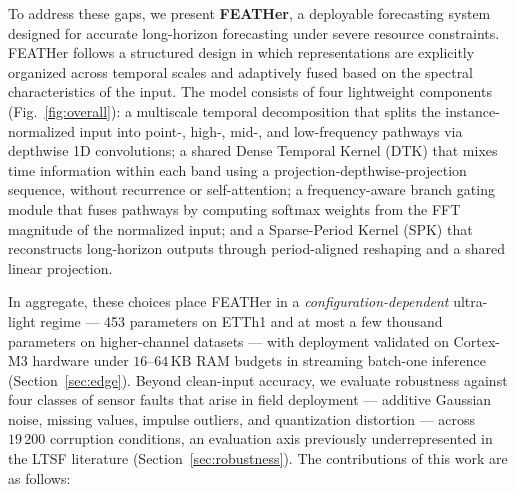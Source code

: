 \documentclass[journal]{IEEEtran}
\theoremstyle{remark}
\begin{document}
To address these gaps, we present \textbf{FEATHer}, a deployable
forecasting system designed for accurate long-horizon forecasting
under severe resource constraints. FEATHer follows a structured
design in which representations are explicitly organized across
temporal scales and adaptively fused based on the spectral
characteristics of the input. The model consists of four lightweight
components (Fig.~\ref{fig:overall}): a multiscale temporal
decomposition that splits the instance-normalized input into point-,
high-, mid-, and low-frequency pathways via depthwise 1D
convolutions; a shared Dense Temporal Kernel (DTK) that mixes time
information within each band using a projection-depthwise-projection
sequence, without recurrence or self-attention; a frequency-aware
branch gating module that fuses pathways by computing softmax
weights from the FFT magnitude of the normalized input; and a
Sparse-Period Kernel (SPK) that reconstructs long-horizon outputs
through period-aligned reshaping and a shared linear projection.

In aggregate, these choices place FEATHer in a
\emph{configuration-dependent} ultra-light regime --- 453 parameters
on ETTh1 and at most a few thousand parameters on higher-channel
datasets --- with deployment validated on Cortex-M3 hardware under
$16$--$64$\,KB RAM budgets in streaming batch-one inference
(Section~\ref{sec:edge}). Beyond clean-input accuracy, we evaluate
robustness against four classes of sensor faults that arise in field
deployment --- additive Gaussian noise, missing values, impulse
outliers, and quantization distortion --- across $19\,200$ corruption
conditions, an evaluation axis previously underrepresented in the
LTSF literature
(Section~\ref{sec:robustness}). The contributions of this work are
as follows:
\end{document}
